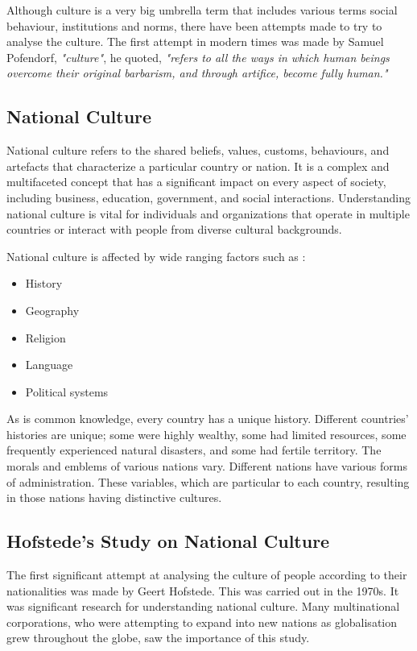 \documentclass[12pt]{article}
\begin{document}
Although culture is a very big umbrella term that includes various terms social behaviour, institutions and norms, there have been attempts made to try to analyse the culture. The first attempt in modern times was made by Samuel Pofendorf, \textit{"culture"}, he quoted, \textit{"refers to all the ways in which human beings overcome their original barbarism, and through artifice, become fully human."}

\subsection{National Culture}

National culture refers to the shared beliefs, values, customs, behaviours, and artefacts that characterize a particular country or nation. It is a complex and multifaceted concept that has a significant impact on every aspect of society, including business, education, government, and social interactions. Understanding national culture is vital for individuals and organizations that operate in multiple countries or interact with people from diverse cultural backgrounds.

National culture is affected by wide ranging factors such as :
\begin{itemize}
    \item History
    \item Geography
    \item Religion
    \item Language
    \item Political systems
\end{itemize}

As is common knowledge, every country has a unique history. Different countries' histories are unique; some were highly wealthy, some had limited resources, some frequently experienced natural disasters, and some had fertile territory. The morals and emblems of various nations vary. Different nations have various forms of administration. These variables, which are particular to each country, resulting in those nations having distinctive cultures.

\subsection{Hofstede's Study on National Culture}

The first significant attempt at analysing the culture of people according to their nationalities was made by Geert Hofstede. This was carried out in the 1970s. It was significant research for understanding national culture. Many multinational corporations, who were attempting to expand into new nations as globalisation grew throughout the globe, saw the importance of this study.
\end{document}
